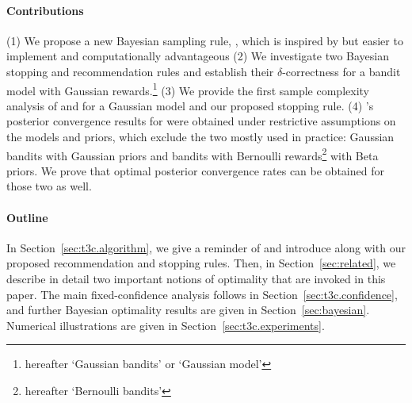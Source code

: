 
\paragraph{Contributions} %
(1) We propose a new Bayesian sampling rule, \TCC, which is inspired by \TTTS but easier to implement and computationally advantageous (2) We investigate two Bayesian stopping and recommendation rules and establish their $\delta$-correctness for a bandit model with Gaussian rewards.\footnote{hereafter `Gaussian bandits' or `Gaussian model'} (3) We provide the first sample complexity analysis of \TTTS and \TCC for a Gaussian model and our proposed stopping rule. (4) \citeauthor{russo2016ttts}'s posterior convergence results for \TTTS were obtained under restrictive assumptions on the models and priors, which exclude the two mostly used in practice: Gaussian bandits with Gaussian priors and bandits with Bernoulli rewards\footnote{hereafter `Bernoulli bandits'} with Beta priors. We prove that optimal posterior convergence rates can be obtained for those two as well.

\paragraph{Outline} In Section~\ref{sec:t3c.algorithm}, we give a reminder of \TTTS and introduce \TCC along with our proposed recommendation and stopping rules. Then, in Section~\ref{sec:related}, we describe in detail two important notions of optimality that are invoked in this paper. The main fixed-confidence analysis follows in Section~\ref{sec:t3c.confidence}, and further Bayesian optimality results are given in Section~\ref{sec:bayesian}. Numerical illustrations are given in Section~\ref{sec:t3c.experiments}.
